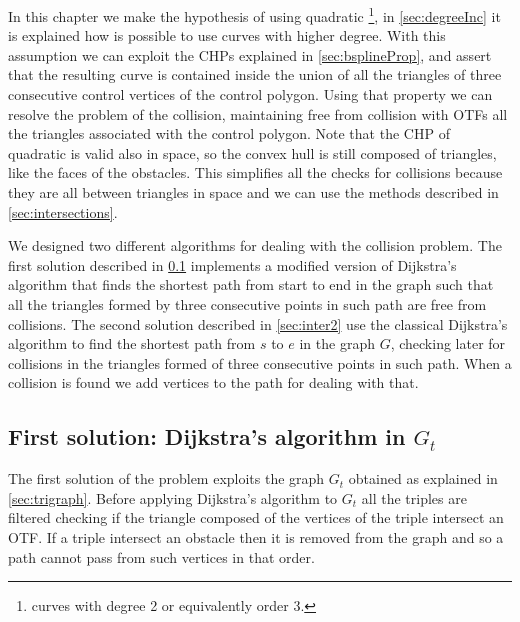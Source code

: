 \documentclass[dissertation.tex]{subfiles}
\begin{document}
In this chapter we make the hypothesis of using
quadratic \bss\footnote{\bss curves with degree 2 or equivalently order 3.}, in
\cref{sec:degreeInc} it is explained how is possible to use curves with
higher degree. With this assumption we can exploit the \acp{CHP}
explained in \cref{sec:bsplineProp}, and assert that the 
resulting curve is contained inside the union of all the triangles of
three consecutive control vertices of the control
polygon. Using that property we can resolve the problem of the
collision, maintaining free 
from collision with \acp{OTF} all the triangles associated with the control
polygon. Note that the \ac{CHP} of quadratic
\bss is valid also in space, so the convex hull is still composed
of triangles, like the faces of the
obstacles. This simplifies all the checks for collisions because they
are all between triangles in space and we can use the methods
described in \cref{sec:intersections}.

We designed two different algorithms for dealing with the collision
problem. The first solution described in \cref{sec:inter1} implements
a modified version of Dijkstra's
algorithm that finds the shortest path from start to end in the graph
such that all the triangles formed by three consecutive points in such path
are free from collisions. The second solution described in
\cref{sec:inter2} use the classical Dijkstra's algorithm to find
the shortest path from $s$ to $e$ in the graph $G$, checking later for
collisions in the triangles formed of three consecutive points in such
path. When a collision is found we add vertices to the path for dealing
with that.

\subsection{First solution: Dijkstra's algorithm in $G_t$}\label{sec:inter1}
The first solution of the problem exploits the graph $G_t$ obtained as
explained in \cref{sec:trigraph}. Before applying Dijkstra's algorithm
to $G_t$ all the triples are filtered checking if the
triangle composed of the vertices of the triple intersect an
\ac{OTF}. If a triple intersect an obstacle then it is removed from the
graph
and so a path cannot pass from such vertices in that order.
\end{document}
